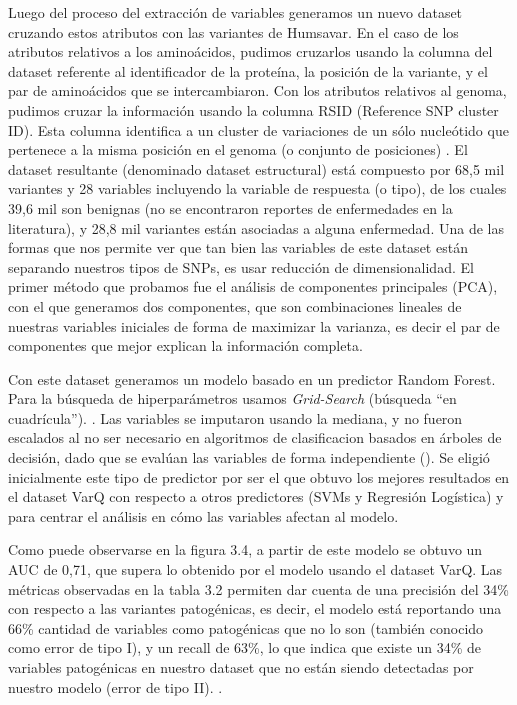 \vspace{2mm}
\vspace{2mm}

Luego del proceso del extracción de variables generamos un nuevo dataset cruzando estos atributos con las variantes de Humsavar. En el caso de los atributos relativos a los aminoácidos, pudimos cruzarlos usando la columna del dataset referente al identificador de la proteína, la posición de la variante, y el par de aminoácidos que se intercambiaron. Con los atributos relativos al genoma, pudimos cruzar la información usando la columna RSID (Reference SNP cluster ID). Esta columna identifica a un cluster de variaciones de un sólo nucleótido que pertenece a la misma posición en el genoma (o conjunto de posiciones) \cite{Ostell2007}. 
El dataset resultante (denominado dataset estructural) está compuesto por 68,5 mil variantes y 28 variables incluyendo la variable de respuesta (o tipo), de los cuales 39,6 mil son benignas (no se encontraron reportes de enfermedades en la literatura), y 28,8 mil variantes están asociadas a alguna enfermedad. 
Una de las formas que nos permite ver que tan bien las variables de este dataset están separando nuestros tipos de SNPs, es usar reducción de dimensionalidad. El primer método que probamos fue el análisis de componentes principales (PCA), con el que generamos dos componentes, que son combinaciones lineales de nuestras variables iniciales de forma de maximizar la varianza, es decir el par de componentes que mejor explican la información completa.


Con este dataset generamos un modelo basado en un predictor Random Forest. Para la búsqueda de hiperparámetros usamos \textit{Grid-Search} (búsqueda ``en cuadrícula''). . Las variables se imputaron usando la mediana, y no fueron escalados al no ser necesario en algoritmos de clasificacion basados en árboles de decisión, dado que se evalúan las variables de forma independiente (). Se eligió inicialmente este tipo de predictor por ser el que obtuvo los mejores resultados en el dataset VarQ  con respecto a otros predictores (SVMs y Regresión Logística) y para centrar el análisis en cómo las variables afectan al modelo.  

Como puede observarse en la figura 3.4, a partir de este modelo se obtuvo un AUC de 0,71, que supera lo obtenido por el modelo usando el dataset VarQ. Las métricas observadas en la tabla 3.2 permiten dar cuenta de una precisión del 34\% con respecto a las variantes patogénicas, es decir, el modelo está reportando una 66\% cantidad de variables como patogénicas que no lo son (también conocido como error de tipo I), y un recall de 63\%, lo que indica que existe un 34\% de variables patogénicas en nuestro dataset que no están siendo detectadas por nuestro modelo (error de tipo II). .

